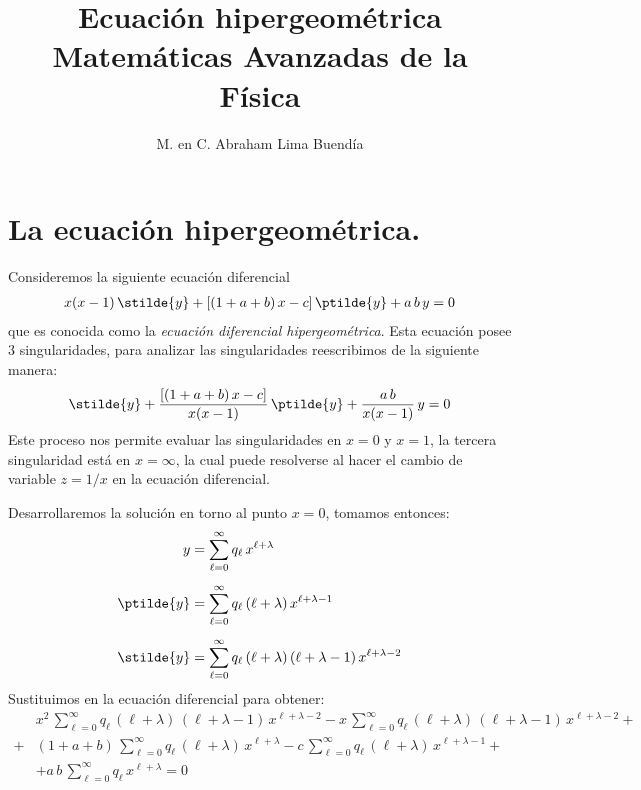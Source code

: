
\title{Ecuación hipergeométrica \\ \large{Matemáticas Avanzadas de la Física}\vspace{-3ex}}
\author{M. en C. Abraham Lima Buendía}
\date{ }

\vspace{-4cm}
\maketitle
\fontsize{14}{14}\selectfont
\section{La ecuación hipergeométrica.}
Consideremos la siguiente ecuación diferencial
\begin{align*}
x (x - 1) \, \stilde{y} + [(1 + a + b) \, x - c] \, \ptilde{y} + a \, b \, y = 0
\end{align*}
que es conocida como la \emph{ecuación diferencial hipergeométrica}. Esta ecuación posee $3$ singularidades, para analizar las singularidades reescribimos de la siguiente manera:
\begin{align*}
\stilde{y} + \dfrac{[(1 + a + b) \, x - c]}{x (x -1)} \, \ptilde{y} + \dfrac{a \, b}{x (x - 1)} \, y = 0
\end{align*}
Este proceso nos permite evaluar las singularidades en $x = 0$ y $x = 1$, la tercera singularidad está en $x = \infty$, la cual puede resolverse al hacer el cambio de variable $z = 1 /x$ en la ecuación diferencial.
\par
Desarrollaremos la solución en torno al punto $x = 0$, tomamos entonces:
\begin{align*}
y &= \sum_{\ell=0}^{\infty} q_{\ell} \, x^{\ell + \lambda} \\[0.5em]
\ptilde{y} &= \sum_{\ell=0}^{\infty} q_{\ell} \, (\ell + \lambda) \, x^{\ell+\lambda-1} \\[0.5em]
\stilde{y} &= \sum_{\ell=0}^{\infty} q_{\ell} \, (\ell + \lambda) \, (\ell + \lambda - 1) \, x^{\ell+\lambda-2}
\end{align*}
Sustituimos en la ecuación diferencial para obtener:
\begin{align*}
&x^{2} \, \sum_{\ell=0}^{\infty} q_{\ell} \, (\ell + \lambda) \, (\ell + \lambda - 1) \, x^{\ell+\lambda-2} - x \, \sum_{\ell=0}^{\infty} q_{\ell} \, (\ell + \lambda) \, (\ell + \lambda - 1) \, x^{\ell+\lambda-2} + \\[0.5em]
+& (1 + a + b) \, \sum_{\ell=0}^{\infty} q_{\ell} \, (\ell + \lambda) \, x^{\ell+\lambda} - c \, \sum_{\ell=0}^{\infty} q_{\ell} \, (\ell + \lambda) \, x^{\ell+\lambda-1} + \\[0.5em]
&+ a \, b \, \sum_{\ell=0}^{\infty} q_{\ell} \, x^{\ell + \lambda} = 0
\end{align*}
